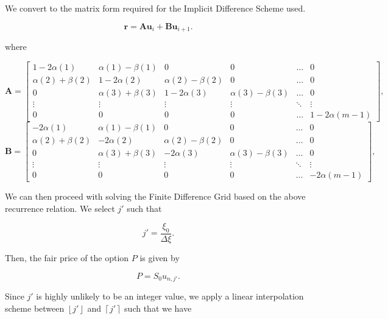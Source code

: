 \documentclass{article}
\begin{document}
We convert to the matrix form required for the Implicit Difference Scheme used.

\begin{equation}
  \textbf{r} = \textbf{Au}_{i} + \textbf{Bu}_{i+1}.
\end{equation}

where

\begin{equation}
  \textbf{A} = \begin{bmatrix}
    1-2\alpha(1) & \alpha(1) - \beta(1) & 0 & 0 & \hdots & 0 \\
    \alpha(2) + \beta(2) & 1-2\alpha(2) & \alpha(2) - \beta(2) & 0 & \hdots & 0 \\
    0 & \alpha(3) + \beta(3) & 1-2\alpha(3) & \alpha(3) - \beta(3) & \hdots & 0 \\
    \vdots & \vdots & \vdots & \vdots & \ddots & \vdots \\
    0 & 0 & 0 & 0 & \hdots & 1-2\alpha(m-1)
  \end{bmatrix},
\end{equation}
\begin{equation}
  \textbf{B} = \begin{bmatrix}
    -2\alpha(1) & \alpha(1) - \beta(1) & 0 & 0 & \hdots & 0 \\
    \alpha(2) + \beta(2) & -2\alpha(2) & \alpha(2) - \beta(2) & 0 & \hdots & 0 \\
    0 & \alpha(3) + \beta(3) & -2\alpha(3) & \alpha(3) - \beta(3) & \hdots & 0 \\
    \vdots & \vdots & \vdots & \vdots & \ddots & \vdots \\
    0 & 0 & 0 & 0 & \hdots & -2\alpha(m-1)
  \end{bmatrix},
\end{equation}

We can then proceed with solving the Finite Difference Grid based on the above recurrence relation. We select \(j'\) such that

\begin{equation}
  j' = \frac{\xi_0}{\Delta\xi}.
\end{equation}

Then, the fair price of the option \(P\) is given by

\begin{equation}
  P = S_0 u_{n, j'}.
\end{equation}

Since \(j'\) is highly unlikely to be an integer value, we apply a linear interpolation scheme between \(\left \lfloor{j'}\right \rfloor\) and \(\left \lceil{j'}\right \rceil\) such that we have
\end{document}
